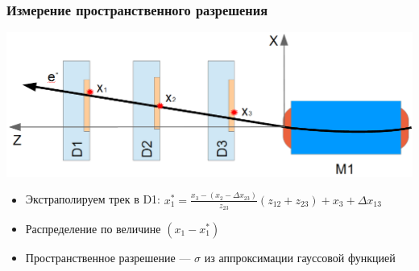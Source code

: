 \documentclass[14pt]{beamer}
\begin{document}

\begin{frame}[t]
\frametitle{Измерение пространственного разрешения}	\centering \includegraphics[width=0.7\linewidth]{reg_eff_exp_scheme.png}
		\small{\begin{itemize}
				\item Экстраполируем трек в D1: $\displaystyle x_{1}^{*} = \frac{x_3- (x_2 -\Delta x_{23}) }{z_{23}}(z_{12}+z_{23})+ x_3 + \Delta x_{13}$
				\item Распределение по величине $(x_1 - x_{1}^{*})$
				\item Пространственное разрешение --- $\sigma$ из аппроксимации гауссовой функцией
				\end{itemize}}
\end{frame}
\end{document}
